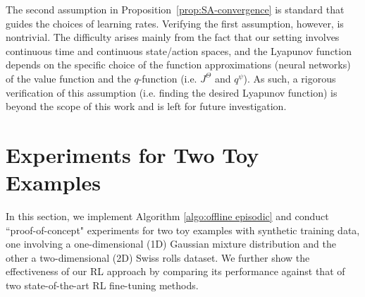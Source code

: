 \documentclass[11pt]{article}
\begin{document}
The second assumption in Proposition~\ref{prop:SA-convergence} is standard that guides the choices of learning rates.
Verifying the first assumption, however, is nontrivial. The difficulty arises mainly from the fact that our setting involves continuous time and continuous state/action spaces, and the Lyapunov function depends on the specific choice of the function approximations (neural networks) of  the value function
and the $q$-function (i.e. $J^{\Theta}$ and $q^{\psi}$).
As such, a  rigorous verification of this assumption (i.e. finding the desired Lyapunov function) is beyond the scope of this work and is left for future investigation.








\section{Experiments for Two Toy Examples}\label{sec:experiment}
In this section, we implement Algorithm \ref{algo:offline episodic} and conduct ``proof-of-concept" experiments for two toy examples with synthetic training data, one involving a one-dimensional (1D) Gaussian mixture distribution and the other a two-dimensional (2D) Swiss rolls dataset. We further show the effectiveness of our RL approach by comparing its performance against that of two state-of-the-art RL fine-tuning methods.
\end{document}
